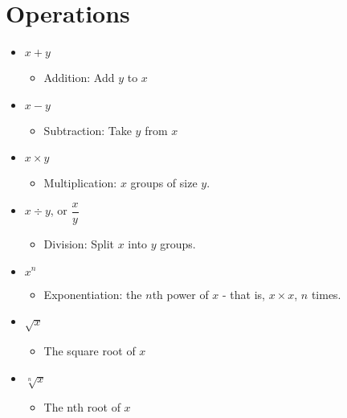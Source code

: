 \section{Operations}

\begin{itemize}	

\item $x + y$
\begin{itemize}
\item Addition: Add $y$ to $x$
\end{itemize}

\item $x - y$
\begin{itemize}
\item Subtraction: Take $y$ from $x$
\end{itemize}

\item $x\times y$
\begin{itemize}
\item Multiplication: $x$ groups of size $y$.
\end{itemize}

\item $x\div y$, or $\dfrac{x}{y}$
\begin{itemize}
\item Division: Split $x$ into $y$ groups.
\end{itemize}

\item $x^n$
\begin{itemize}
\item Exponentiation: the $n$th power of $x$ - that is, $x\times x$, $n$ times.
\end{itemize}

\item $\sqrt{x}$
\begin{itemize}
\item The square root of $x$
\end{itemize}

\item $\sqrt[n]{x}$
\begin{itemize}
\item The nth root of $x$
\end{itemize}


\end{itemize}
